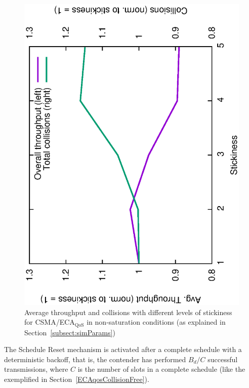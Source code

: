 \begin{figure}[tb]
	\centering
		\includegraphics[width=0.7\linewidth, angle=-90]{figures/stickEv-throughput-overallOnly.eps}
		\caption{Average throughput and collisions with different levels of stickiness for CSMA/ECA$_{\text{QoS}}$ in non-saturation conditions (as explained in Section~\ref{subsect:simParams})}
		\label{fig:stickEv-throughput-overallOnly}
	\end{figure}

The Schedule Reset mechanism is activated after a complete schedule with a deterministic backoff, that is, the contender has performed $B_{d}/C$ successful transmissions, where $C$ is the number of slots in a complete schedule (like the exemplified in Section~\ref{ECAqosCollisionFree}).
